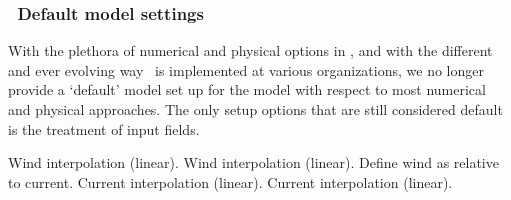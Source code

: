 \vsssub
\subsubsection{~Default model settings} \label{sub:opt_default}
\vsssub

With the plethora of numerical and physical options in \ws, and with the
different and ever evolving way \ws\ is implemented at various organizations,
we no longer provide a `default' model set up for the model with respect to
most numerical and physical approaches. The only setup options that are still
considered default is the treatment of input fields.

\begin{slist}
 {Wind interpolation (linear).}
 {Wind interpolation (linear).}
 {Define wind as relative to current.}
 {Current interpolation (linear).}
 {Current interpolation (linear).}
\end{slist}
